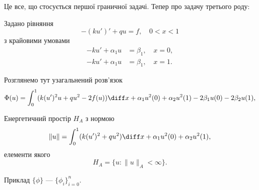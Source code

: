 Це все, що стосується першої граничної задачі. Тепер про задачу третього роду:
\begin{example}
    Задано рівняння
    \begin{equation*}
        -(k u')' + qu = f, \quad 0 < x < 1
    \end{equation*}
    з крайовими умовами
    \begin{align*}
        - k u' + \alpha_1 u &= \beta_1, \quad x = 0, \\
        - k u' + \alpha_1 u &= \beta_1, \quad x = 1.
    \end{align*}
\end{example}

\begin{solution}
    Розглянемо тут узагальнений розв'язок
    \begin{equation*}
        \Phi(u) = \int_0^1 (k(u')^2 u + q u^2 - 2 f(u)) \diff x + \alpha_1 u^2(0) + \alpha_2 u^2(1) - 2 \beta_1 u(0) - 2 \beta_2 u(1),
    \end{equation*}

    Енергетичний простір $H_A$ з нормою
    \begin{equation}
        \|u\| = \int_0^1 (k (u')^2 + q u^2) \diff x + \alpha_1 u^2(0) + \alpha_2 u^2(1),
    \end{equation}
    елементи якого
    \begin{equation*}
        H_A = \{ u: \|u\|_A < \infty\}.
    \end{equation*}

    Приклад $\{\phi\}$ --- $\{\phi_i\}_{i = 0}^{n}$.
\end{solution}
